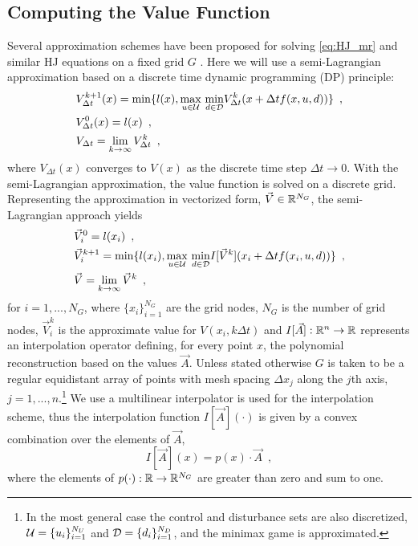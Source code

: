 \subsection{Computing the Value Function}
Several approximation schemes have been proposed for solving \eqref{eq:HJ_mr} and similar HJ equations on a fixed grid $G$ \cite{Bardi1999, Falcone1994, Mitchell2005}. Here we will use a semi-Lagrangian approximation based on a discrete time dynamic programming (DP) principle:
%
\begin{subequations}
\begin{align}
&V_{\Delta t}^{k+1}(x) = \min\{l(x),  \underset{u\in\mathcal{U}}{\max}\text{ }\underset{ d\in\mathcal{D}}{\min} V^{k}_{\Delta t}(x+\Delta t f(x,u,d))\} \enspace,\\
&V_{\Delta t}^{0}(x) = l(x) \enspace,\\
&V_{\Delta t} = \lim_{k\rightarrow \infty} V^{k}_{\Delta t} \enspace,
\end{align}
\end{subequations}%
\noindent where $V_{\Delta t}(x)$ converges to $V(x)$ as the discrete time step $\Delta t \rightarrow 0$. With the semi-Lagrangian approximation, the value function is solved on a discrete grid. Representing the approximation in vectorized form, $\vec{V} \in \mathbb{R}^{N_G}$, the semi-Lagrangian approach yields \ 
\begin{subequations} \label{eq:dp_min_dist}
\begin{align}
&\vec{V}_{i}^{0} = l(x_i) \enspace,\\
&\vec{V}_{i}^{k+1} = \min\{l(x_i),  \underset{u\in\mathcal{U}}{\max}\text{ }\underset{ d\in\mathcal{D}}{\min} I[\vec{V}^{k}](x_i+\Delta t f(x_i,u,d)) \label{eq:dp_min_dist_b}\} \enspace,\\
&\vec{V} = \lim_{k\rightarrow \infty} \vec{V}^{k} \enspace,
\end{align}
\end{subequations}%
\noindent for  $i=1, ..., N_G$, where $\{x_i\}_{i=1}^{N_G}$ are the grid nodes, $N_G$ is the number of grid nodes, $\vec{V}_i^k$ is the approximate value for $V(x_i, k \Delta t)$ and ${I[\vec{A}]:\mathbb{R}^n \rightarrow \mathbb{R}}$ represents an interpolation operator defining, for every point $x$, the polynomial reconstruction based on the values $\vec{A}$. Unless stated otherwise $G$ is taken to be a regular equidistant array of points with mesh spacing $\Delta x_j$ along the $j$th axis, $j=1,...,n$.\footnote{In the most general case the control and disturbance sets are also discretized, $\mathcal{U}=\{u_i\}_{i=1}^{N_U}$ and $\mathcal{D}=\{d_i\}_{i=1}^{N_D}$, and the minimax game is approximated.} We use a multilinear interpolator is used for the interpolation scheme, thus the interpolation function $I[\vec{A}](\cdot)$ is given by a convex combination over the elements of $\vec{A}$,
\begin{equation}
I[\vec{A}](x)= p(x)\cdot \vec{A} \enspace,
\end{equation}%
\noindent where the elements of ${p(\cdot): \mathbb{R} \rightarrow \mathbb{R}^{N_G}}$ are greater than zero and sum to one. 

